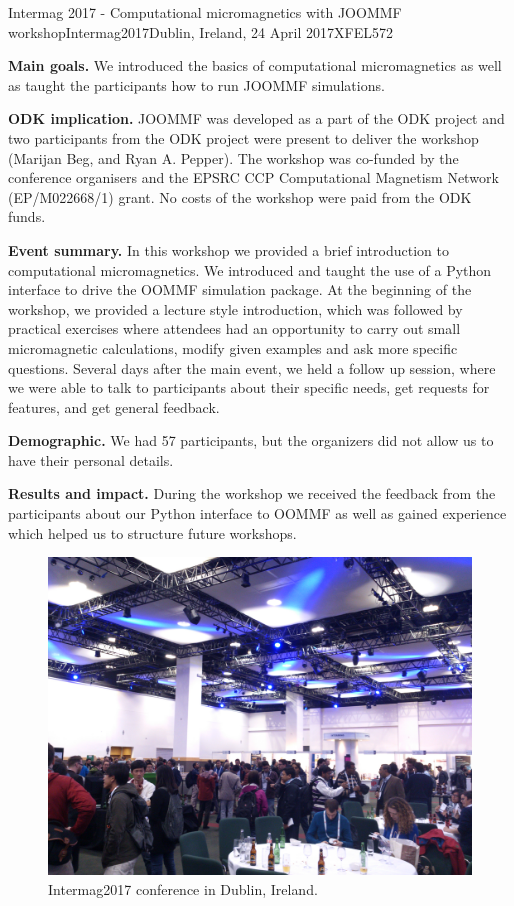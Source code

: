 \begin{event}{Intermag 2017 - Computational micromagnetics with JOOMMF workshop}{Intermag2017}{Dublin, Ireland, 24 April 2017}{XFEL}{57}{2}{}

\textbf{Main goals.} We introduced the basics of computational micromagnetics as well as taught the participants how to run JOOMMF simulations.

\textbf{ODK implication.} JOOMMF was developed as a part of the ODK project and two participants from the ODK project were present to deliver the workshop (Marijan Beg, and Ryan A. Pepper). The workshop was co-funded by the conference organisers and the EPSRC CCP Computational Magnetism Network (EP/M022668/1) grant. No costs of the workshop were paid from the ODK funds.

\textbf{Event summary.} In this workshop we provided a brief introduction to computational micromagnetics. We introduced and taught the use of a Python interface to drive the OOMMF simulation package. At the beginning of the workshop, we provided a lecture style introduction, which was followed by practical exercises where attendees had an opportunity to carry out small micromagnetic calculations, modify given examples and ask more specific questions. Several days after the main event, we held a follow up session, where we were able to talk to participants about their specific needs, get requests for features, and get general feedback.

\textbf{Demographic.} We had 57 participants, but the organizers did not allow us to have their personal details.

\textbf{Results and impact.} During the workshop we received the feedback from the participants about our Python interface to OOMMF as well as gained experience which helped us to structure future workshops.

\begin{figure}[ht]
\includegraphics[scale=.1]{IntermagPhoto1.jpg}
\caption*{Intermag2017 conference in Dublin, Ireland.}
\end{figure}


\end{event}
